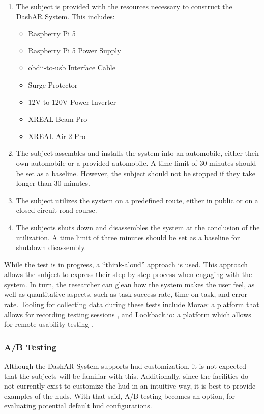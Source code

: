                 \begin{enumerate}
                    \item The subject is provided with the resources necessary to construct the DashAR System. This includes: \
                        \begin{itemize}
                            \item Raspberry Pi 5
                            \item Raspberry Pi 5 Power Supply
                            \item \gls{obdii}-to-\gls{usb} Interface Cable
                            \item Surge Protector
                            \item 12V-to-120V Power Inverter
                            \item XREAL Beam Pro
                            \item XREAL Air 2 Pro
                        \end{itemize}
                    \item The subject assembles and installs the system into an automobile, either their own automobile or a provided automobile. A time limit of 30 minutes should be set as a baseline. However, the subject should not be stopped if they take longer than 30 minutes.
                    \item The subject utilizes the system on a predefined route, either in public or on a closed circuit road course.
                    \item The subjects shuts down and disassembles the system at the conclusion of the utilization. A time limit of three minutes should be set as a baseline for shutdown disassembly.
                \end{enumerate}

                \par While the test is in progress, a ``think-aloud'' approach is used. This approach allows the subject to express their step-by-step process when engaging with the system. In turn, the researcher can glean how the system makes the user feel, as well as quantitative aspects, such as task success rate, time on task, and error rate. Tooling for collecting data during these tests include Morae: a platform that allows for recording testing sessions \cite{Morae2025}, and Lookback.io: a platform which allows for remote usability testing \cite{Lookback.io2025}.

            \subsubsection{A/B Testing}
                \par Although the DashAR System supports \gls{hud} customization, it is not expected that the subjects will be familiar with this. Additionally, since the facilities do not currently exist to customize the \gls{hud} in an intuitive way, it is best to provide examples of the \glspl{hud}. With that said, A/B testing becomes an option, for evaluating potential default \gls{hud} configurations.

